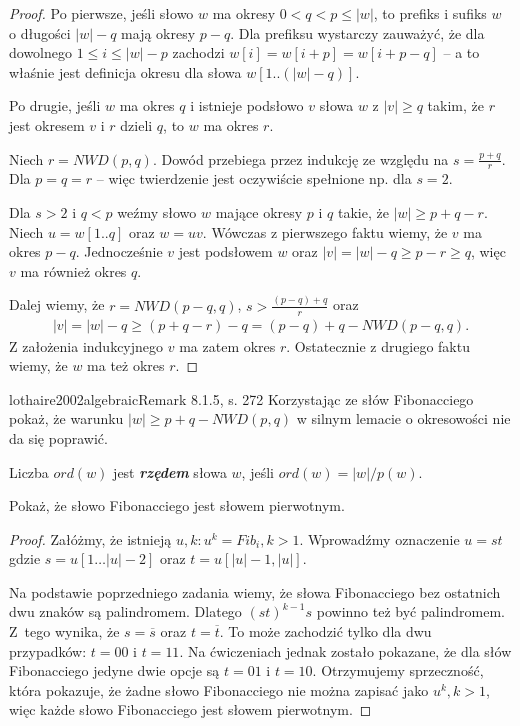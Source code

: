 \begin{proof}%
  Po pierwsze, jeśli słowo $w$ ma okresy $0 < q < p \le |w|$, to prefiks i sufiks $w$ o długości $|w| - q$ mają okresy $p - q$.
  Dla prefiksu wystarczy zauważyć, że dla dowolnego $1 \le i \le |w| - p$ zachodzi $w[i] = w[i + p] = w[i + p - q]$ -- a to właśnie jest definicja okresu dla słowa $w[1..(|w| - q)]$. 

  Po drugie, jeśli $w$ ma okres $q$ i istnieje podsłowo $v$ słowa $w$ z $|v| \ge q$ takim, że $r$ jest okresem $v$ i $r$ dzieli $q$, to $w$ ma okres $r$.
  
  Niech $r = NWD(p, q)$. Dowód przebiega przez indukcję ze względu na $s = \frac{p + q}{r}$. Dla $p = q = r$ -- więc twierdzenie jest oczywiście spełnione np. dla $s = 2$.
  
  Dla $s > 2$ i $q < p$ weźmy słowo $w$ mające okresy $p$ i $q$ takie, że $|w| \ge p + q - r$. Niech $u = w[1..q]$ oraz $w = uv$. Wówczas z pierwszego faktu wiemy, że $v$ ma okres $p - q$.
  Jednocześnie $v$ jest podsłowem $w$ oraz $|v| = |w| - q \ge p - r \ge q$, więc $v$ ma również okres $q$.
  
  Dalej wiemy, że $r = NWD(p - q, q)$, $s > \frac{(p - q) + q}{r}$ oraz
  \begin{align*}
    |v| = |w| - q \ge (p + q - r) - q = (p - q) + q - NWD(p - q, q).
  \end{align*}
  Z założenia indukcyjnego $v$ ma zatem okres $r$. Ostatecznie z drugiego faktu wiemy, że $w$ ma też okres $r$.
\end{proof}

\begin{problem}{lothaire2002algebraic}{Remark 8.1.5, s. 272}
  Korzystając ze słów Fibonacciego pokaż, że warunku $|w| \ge p + q - NWD(p, q)$ w silnym lemacie o okresowości nie da się poprawić.
\end{problem}

\begin{definition}{}{}
  Liczba $ord(w)$ jest {\bf\textit{rzędem}} słowa $w$, jeśli $ord(w) = |w|/p(w)$.
\end{definition}

\begin{problem}{}{}
  Pokaż, że słowo Fibonacciego jest słowem pierwotnym.
\end{problem}

\begin{proof}
Załóżmy, że istnieją $u, k: u^k = Fib_i, k > 1$. Wprowadźmy oznaczenie $u = st$ gdzie $s = u[1\ldots|u|-2]$ oraz $t = u[|u|-1,|u|]$. 

Na podstawie poprzedniego zadania wiemy, że słowa Fibonacciego bez ostatnich dwu znaków są palindromem. Dlatego $(st)^{k-1}s$ powinno też być palindromem. Z~tego wynika, że $s = \overline{s}$ oraz $t = \overline{t}$. To może zachodzić tylko dla dwu przypadków: $t = 00$ i $t = 11$. Na ćwiczeniach jednak zostało pokazane, że dla słów Fibonacciego jedyne dwie opcje są $t = 01$ i $t = 10$. Otrzymujemy sprzeczność, która pokazuje, że żadne słowo Fibonacciego nie można zapisać jako $u^k, k > 1$, więc każde słowo Fibonacciego jest słowem pierwotnym.
\end{proof}

